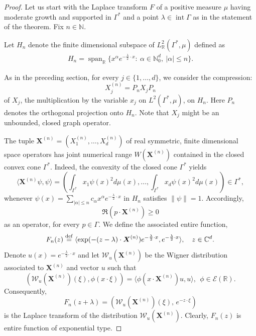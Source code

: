 \documentclass[11pt,reqno]{amsart}
\theoremstyle{plain}
\theoremstyle{definition}
\numberwithin{equation}{section}
\newcommand{\bydef}{\stackrel{\rm def}{=}}
\begin{document}
\begin{proof}
Let us start with the Laplace transform $F$ of a positive measure $\mu$ having moderate growth and supported in $\Gamma^*$ and a point $\lambda \in \operatorname{int} \Gamma$ as in the statement of the theorem. Fix $n\in \mathbb{N}$.

	Let $H_n$ denote the finite dimensional subspace of $L_{\mathbb{R}}^2(\Gamma^*, \mu)$ defined as
    \begin{align*}
        H_n= \operatorname{span}_\mathbb{R} \{x^\alpha e^{-\frac{\lambda}{2} \cdot x} : \ \alpha \in \mathbb{N}_0^d, \ |\alpha| \leq n\}.
        \end{align*}
    
    As in the preceding section, for every $j \in \{1, \dots, d\}$, we consider the compression: 
    $$
    X^{(n)}_j = P_n X_j P_n
    $$ 
    of $X_j$, the multiplication by the variable $x_j$ on $L^2(\Gamma^*, \mu)$, on $H_n$. Here $P_n$ denotes the orthogonal projection onto $H_n$. Note that $X_j$ might be an unbounded, closed graph operator.
	
	The tuple $\boldsymbol{X}^{(n)} = (X^{(n)}_1, \dots, X^{(n)}_d)$ of real symmetric, finite dimensional space operators has joint numerical range $W(\boldsymbol{X}^{(n)})$ contained in the closed convex cone $\Gamma^\ast$. Indeed, the convexity of the closed  cone $\Gamma^\ast$ yields
	$$ \langle \boldsymbol{X}^{(n)} \psi, \psi \rangle =\left(\int_{\Gamma^\ast} x_1 \psi(x)^2 d\mu(x), \ldots, \int_{\Gamma^\ast} x_d \psi(x)^2 d\mu(x) \right) \in \Gamma^\ast,$$
	whenever $\psi(x) = \sum_{|\alpha| \leq n} c_\alpha x^\alpha e^{-\frac{\lambda}{2} \cdot x}$ in $H_n$ satisfies 
	$ \|\psi\| = 1.$
	Accordingly,
	$$ \Re (p\cdot \boldsymbol{X}^{(n)}) \geq 0$$ as an operator, for every $ p \in \Gamma$. 
We define the associated entire function,
	$$ F_n(z) \bydef \langle \exp (- (z- \lambda) \cdot \boldsymbol{X}^{(n)}) e^{-\frac{\lambda}{2} \cdot x}, e^{-\frac{\lambda}{2} \cdot x} \rangle, \quad z\in \mathbb{C}^d.$$
	Denote $u(x) =  e^{-\frac{\lambda}{2} .\cdot x}$ and let ${\mathcal W}_u(\boldsymbol{X}^{(n)})$ be the Wigner distribution associated to $\boldsymbol{X}^{(n)}$ and vector $u$ such that
	$$( {\mathcal W}_u(\boldsymbol{X}^{(n)})(\xi), \phi(x \cdot \xi)) = \langle \phi( x\cdot \boldsymbol{X}^{(n)}) u, u\rangle, \ \ \phi \in {\mathcal E}({\mathbb R}).$$
	Consequently, 
	$$ F_n(z + \lambda) = ({\mathcal W}_u(\boldsymbol{X}^{(n)})(\xi),\,  e^{-z \cdot \xi})$$
	is the Laplace transform of the distribution ${\mathcal W}_u(\boldsymbol{X}^{(n)})$. Clearly, $F_n(z)$ is entire function of exponential type. 


\end{proof}
\end{document}

